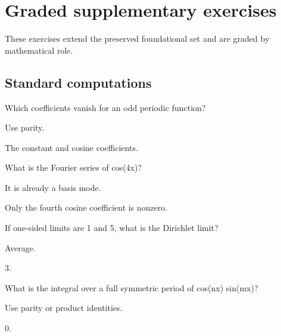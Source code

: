 \section{Graded supplementary exercises}
These exercises extend the preserved foundational set and are graded by mathematical role.

\subsection*{Standard computations}

\begin{exercise}\label{exr:iii09-expand-01}
Which coefficients vanish for an odd periodic function?
\end{exercise}
\begin{hint}
Use parity.
\end{hint}
\begin{solution}
The constant and cosine coefficients.
\end{solution}

\begin{exercise}\label{exr:iii09-expand-02}
What is the Fourier series of cos(4x)?
\end{exercise}
\begin{hint}
It is already a basis mode.
\end{hint}
\begin{solution}
Only the fourth cosine coefficient is nonzero.
\end{solution}

\begin{exercise}\label{exr:iii09-expand-03}
If one-sided limits are 1 and 5, what is the Dirichlet limit?
\end{exercise}
\begin{hint}
Average.
\end{hint}
\begin{solution}
3.
\end{solution}

\begin{exercise}[Orthogonality]\label{exr:iii09-expand-04}
What is the integral over a full symmetric period of cos(nx) sin(mx)?
\end{exercise}
\begin{hint}
Use parity or product identities.
\end{hint}
\begin{solution}
0.
\end{solution}

